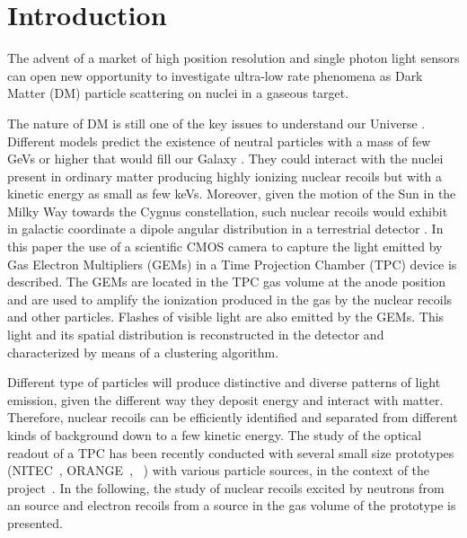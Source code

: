 \documentclass[12pt]{iopart}
\begin{document}
\section{Introduction}


The advent of a market of high position resolution and single photon
light sensors can open new opportunity to investigate ultra-low rate
phenomena as Dark Matter (DM) particle scattering on nuclei in a
gaseous target.

The nature of DM is still one of the key issues to understand our
Universe \cite{PhysRevLett.39.165,Undagoitia_2015}.  Different models
predict the existence of neutral particles with a mass of few GeVs or
higher that would fill our Galaxy
\cite{PhysRevLett.113.171301,PhysRevD.79.115016,doi:10.1142/S0217751X13300287,ZUREK201491}. They
could interact with the nuclei present in ordinary matter producing
highly ionizing nuclear recoils but with a kinetic energy as small as
few keVs. Moreover, given the motion of the Sun in the Milky Way
towards the Cygnus constellation, such nuclear recoils would exhibit
in galactic coordinate a dipole angular distribution in a terrestrial
detector \cite{MAYET20161}.  In this paper the use of a scientific
CMOS camera to capture the light emitted by Gas Electron Multipliers
(GEMs) in a Time Projection Chamber (TPC) device is described. The
GEMs are located in the TPC gas volume at the anode position and are
used to amplify the ionization produced in the gas by the nuclear
recoils and other particles. Flashes of visible light are also emitted
by the GEMs. This light and its spatial distribution is reconstructed
in the detector and characterized by means of a clustering algorithm.


Different type of particles will produce distinctive and diverse
patterns of light emission, given the different way they deposit
energy and interact with matter.
Therefore, nuclear recoils can be efficiently identified and separated
from different kinds of background down to a few \keV kinetic energy.
The study of the optical readout of a TPC has been recently conducted
with several small size prototypes (NITEC~\cite{JINST:nitec},
ORANGE~\cite{NIM:Marafinietal,bib:jinst_orange2},
\lemon~\cite{bib:eps, bib:ieee17,bib:elba}) with various particle
sources, in the context of the \cygno
project~\cite{Abritta_Costa_2020,CYGNOweb}. In the following, the
study of nuclear recoils excited by neutrons from an \ambe source and
electron recoils from a \fe source in the gas volume of the \lemon
prototype is presented.
\end{document}
